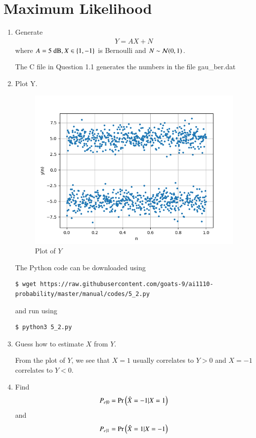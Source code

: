 \documentclass[journal,12pt,twocolumn]{IEEEtran}
\renewcommand\thesection{\arabic{section}}
\begin{document}
\section{Maximum Likelihood}
\begin{enumerate}[label=\thesection.\arabic*
,ref=\thesection.\theenumi]
\item Generate 
	\begin{align}
		Y = AX + N
	\end{align}
where $A  = 5 \text{ dB}, X \in \left\{1, -1\right\}$ is Bernoulli and $N \sim \mathcal{N}(0, 1)$.

\solution
The C file in Question 1.1 generates the numbers in the file gau\_ber.dat
\item Plot Y.
	\begin{figure}
		\includegraphics[width=\columnwidth]{figs/5_2.png}
		\caption{Plot of $Y$}
		\label{fig:wave}
	\end{figure}

\solution
The Python code can be downloaded using
\begin{lstlisting}
$ wget https://raw.githubusercontent.com/goats-9/ai1110-probability/master/manual/codes/5_2.py
\end{lstlisting}
and run using
\begin{lstlisting}
$ python3 5_2.py
\end{lstlisting}
\item Guess how to estimate $X$ from $Y$.

\solution
From the plot of $Y$, we see that $X = 1$ usually correlates to $Y > 0$ and $X = -1$ correlates to $Y < 0$.
\item Find 
	\begin{align}
		P_{e|0} = \Pr\left(\hat{X} = -1|X = 1\right)
	\end{align}
and
	\begin{align}
		P_{e|1} = \Pr\left(\hat{X} = 1|X = -1\right)
	\end{align}


\end{enumerate}
\end{document}
